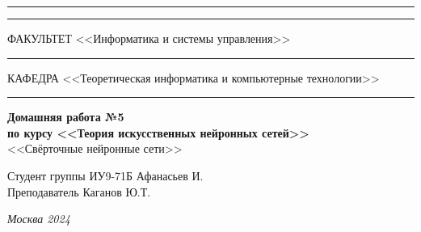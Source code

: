\documentclass[a4paper, 14pt]{extarticle}
\begin{document}
\begin{titlepage}
\vspace{-25pt}
\hspace{-35pt}\rule{\textwidth}{2.3pt}

\vspace*{-20.3pt}
\hspace{-35pt}\rule{\textwidth}{0.4pt}

\vspace{1.5ex}
\hspace{-35pt} \noindent \small ФАКУЛЬТЕТ\hspace{80pt} <<Информатика и системы управления>>

\vspace*{-16pt}
\hspace{47pt}\rule{0.83\textwidth}{0.4pt}

\vspace{0.5ex}
\hspace{-35pt} \noindent \small КАФЕДРА\hspace{50pt} <<Теоретическая информатика и компьютерные технологии>>

\vspace*{-16pt}
\hspace{30pt}\rule{0.866\textwidth}{0.4pt}
  
\vspace{11em}

\begin{center}
\Large {\bf Домашняя работа №5} \\ 
\large {\bf по курсу <<Теория искусственных нейронных сетей>>} \\
\large <<Свёрточные нейронные сети>> 

\end{center}\normalsize

\vspace{8em}

\begin{flushright}
  {Студент группы ИУ9-71Б Афанасьев И. \hspace*{15pt}\\ 
  \vspace{2ex}
  Преподаватель Каганов Ю.Т.\hspace*{15pt}}
\end{flushright}

\bigskip

\vfill
 

\begin{center}
\textsl{Москва 2024}
\end{center}
\end{titlepage}
\end{document}
